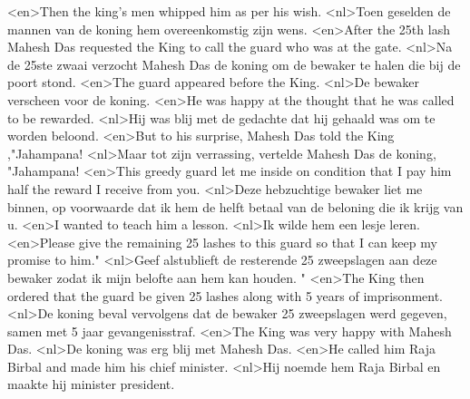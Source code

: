 <en>Then the king’s men whipped him as per his wish.
<nl>Toen geselden de mannen van de koning hem overeenkomstig zijn wens.
<en>After the 25th lash Mahesh Das requested the King to call the guard who was at the gate.
<nl>Na de 25ste zwaai verzocht Mahesh Das de koning om de bewaker te halen die bij de poort stond.
<en>The guard appeared before the King.
<nl>De bewaker verscheen voor de koning.
<en>He was happy at the thought that he was called to be rewarded.
<nl>Hij was blij met de gedachte dat hij gehaald was om te worden beloond.
<en>But to his surprise, Mahesh Das told the King ,"Jahampana!
<nl>Maar tot zijn verrassing, vertelde Mahesh Das de koning, "Jahampana!
<en>This greedy guard let me inside on condition that I pay him half the reward I receive from you.
<nl>Deze hebzuchtige bewaker liet me binnen, op voorwaarde dat ik hem de helft betaal van de beloning die ik  krijg  van u.
<en>I wanted to teach him a lesson.
<nl>Ik wilde hem een lesje leren.
<en>Please give the remaining 25 lashes to this guard so that I can keep my promise to him."
<nl>Geef alstublieft de resterende 25 zweepslagen aan deze bewaker zodat ik mijn belofte aan hem kan houden. "
<en>The King then ordered that the guard be given 25 lashes along with 5 years of imprisonment.
<nl>De koning beval vervolgens dat de bewaker 25 zweepslagen werd gegeven, samen met 5 jaar gevangenisstraf.
<en>The King was very happy with Mahesh Das.
<nl>De koning was erg blij met Mahesh Das.
<en>He called him Raja Birbal and made him his chief minister.
<nl>Hij noemde  hem Raja Birbal en maakte hij minister president.

